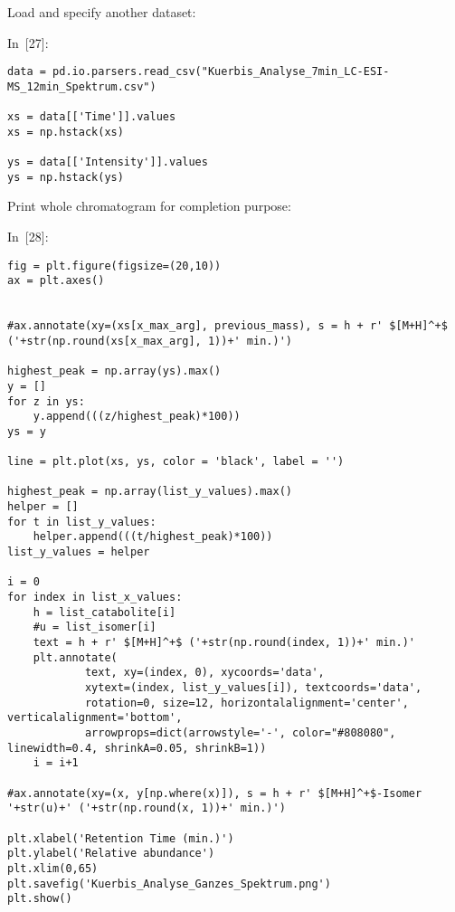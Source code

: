 \documentclass[]{article}
\begin{document}
Load and specify another dataset:

In~{[}27{]}:

\begin{verbatim}
data = pd.io.parsers.read_csv("Kuerbis_Analyse_7min_LC-ESI-MS_12min_Spektrum.csv")

xs = data[['Time']].values
xs = np.hstack(xs)

ys = data[['Intensity']].values
ys = np.hstack(ys)
\end{verbatim}

Print whole chromatogram for completion purpose:

In~{[}28{]}:

\begin{verbatim}
fig = plt.figure(figsize=(20,10))
ax = plt.axes()


#ax.annotate(xy=(xs[x_max_arg], previous_mass), s = h + r' $[M+H]^+$ ('+str(np.round(xs[x_max_arg], 1))+' min.)')

highest_peak = np.array(ys).max()
y = []
for z in ys:
    y.append(((z/highest_peak)*100))
ys = y

line = plt.plot(xs, ys, color = 'black', label = '')

highest_peak = np.array(list_y_values).max()
helper = []
for t in list_y_values:
    helper.append(((t/highest_peak)*100))
list_y_values = helper

i = 0
for index in list_x_values:
    h = list_catabolite[i]
    #u = list_isomer[i]
    text = h + r' $[M+H]^+$ ('+str(np.round(index, 1))+' min.)'
    plt.annotate(
            text, xy=(index, 0), xycoords='data',
            xytext=(index, list_y_values[i]), textcoords='data',
            rotation=0, size=12, horizontalalignment='center', verticalalignment='bottom',
            arrowprops=dict(arrowstyle='-', color="#808080", linewidth=0.4, shrinkA=0.05, shrinkB=1))
    i = i+1
        
#ax.annotate(xy=(x, y[np.where(x)]), s = h + r' $[M+H]^+$-Isomer '+str(u)+' ('+str(np.round(x, 1))+' min.)')

plt.xlabel('Retention Time (min.)')
plt.ylabel('Relative abundance')
plt.xlim(0,65)
plt.savefig('Kuerbis_Analyse_Ganzes_Spektrum.png')
plt.show()
\end{verbatim}
\end{document}
